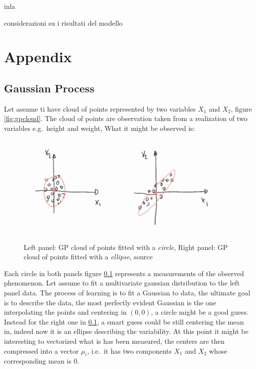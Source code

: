 \documentclass[
  12pt,
  a4paper,
  oneside]{book}
\theoremstyle{definition}
\theoremstyle{definition}
\theoremstyle{definition}
\theoremstyle{remark}
\begin{document}
inla

considerazioni su i risultati del modello

\hypertarget{appendix}{%
\chapter*{Appendix}\label{appendix}}

\hypertarget{gpbasics}{%
\section{Gaussian Process}\label{gpbasics}}

Let assume ti have cloud of points represented by two variables \(X_1\) and \(X_2\), figure \ref{fig:gpcloud}. The cloud of points are observation taken from a realization of two variables e.g.~height and weight, What it might be observed is:

\begin{figure}
\centering
\includegraphics{appendix_images/gp_base_1.jpg}
\caption{\label{fig:gpclouds}Left panel: GP cloud of points fitted with a \emph{circle}, Right panel: GP cloud of points fitted with a \emph{ellipse}, source \citet{YT:freitas1}}
\end{figure}

Each circle in both panels figure \ref{fig:gpclouds} represents a measurements of the observed phenomenon. Let assume to fit a multivariate gaussian distribution to the left panel data. The process of learning is to fit a Gaussian to data, the ultimate goal is to describe the data, the most perfectly evident Gaussian is the one interpolating the points and centering in \(\left(0,0\right)\), a circle might be a good guess. Instead for the right one in \ref{fig:gpclouds}, a smart guess could be still centering the mean in, indeed now it is an ellipse describing the variability.
At this point it might be interesting to vectorized what is has been measured, the centers are then compressed into a vector \(\mu_{i}\), i.e.~it has two components \(X_1\) and \(X_2\) whose corresponding mean is 0.
\end{document}
